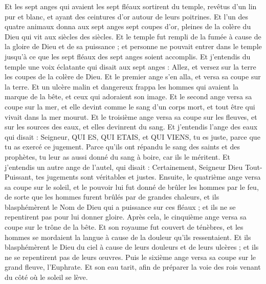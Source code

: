 \begin{multicols}{2}
Et les sept anges qui avaient les sept fléaux sortirent du temple, revêtus d'un lin pur et blanc, et ayant des ceintures d'or autour de leurs poitrines.
Et l'un des quatre animaux donna aux sept anges sept coupes d'or, pleines de la colère du Dieu qui vit aux siècles des siècles.
Et le temple fut rempli de la fumée à cause de la gloire de Dieu et de sa puissance ; et personne ne pouvait entrer dans le temple jusqu'à ce que les sept fléaux des sept anges soient accomplis.
\VerseOne{}Et j'entendis du temple une voix éclatante qui disait aux sept anges : Allez, et versez sur la terre les coupes de la colère de Dieu.
Et le premier ange s'en alla, et versa sa coupe sur la terre. Et un ulcère malin et dangereux frappa les hommes qui avaient la marque de la bête, et ceux qui adoraient son image.
Et le second ange versa sa coupe sur la mer, et elle devint comme le sang d'un corps mort, et tout être qui vivait dans la mer mourut.
Et le troisième ange versa sa coupe sur les fleuves, et sur les sources des eaux, et elles devinrent du sang.
Et j'entendis l'ange des eaux qui disait : Seigneur, QUI ES, QUI ETAIS, et QUI VIENS, tu es juste, parce que tu as exercé ce jugement.
Parce qu'ils ont répandu le sang des saints et des prophètes, tu leur as aussi donné du sang à boire, car ils le méritent.
Et j'entendis un autre ange de l'autel, qui disait : Certainement, Seigneur Dieu Tout-Puissant, tes jugements sont véritables et justes.
Ensuite, le quatrième ange versa sa coupe sur le soleil, et le pouvoir lui fut donné de brûler les hommes par le feu,
de sorte que les hommes furent brûlés par de grandes chaleurs, et ils blasphémèrent le Nom de Dieu qui a puissance sur ces fléaux ; et ils ne se repentirent pas pour lui donner gloire.
Après cela, le cinquième ange versa sa coupe sur le trône de la bête. Et son royaume fut couvert de ténèbres, et les hommes se mordaient la langue à cause de la douleur qu'ils ressentaient.
Et ils blasphémèrent le Dieu du ciel à cause de leurs douleurs et de leurs ulcères ; et ils ne se repentirent pas de leurs œuvres.
Puis le sixième ange versa sa coupe sur le grand fleuve, l'Euphrate. Et son eau tarit, afin de préparer la voie des rois venant du côté où le soleil se lève.

\end{multicols}
